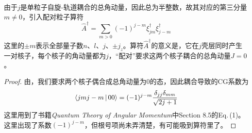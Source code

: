 由于$j$是单粒子自旋-轨道耦合的总角动量，因此总为半整数，故其对应的第三分量$m\neq 0$，引入配对粒子算符
\begin{equation}
    \hat{A}^{\dagger} = \sum_{m > 0} (-1)^{j - m} \xi_{jm}^{\dagger} \xi_{j-m}^{\dagger}
    \label{def:pair}
\end{equation}
这里的$\pm m$表示全部量子数$n$、$l$、$j$、$\pm j_z$。算符$\hat{A}^{\dagger}$的意义是，它在$j$壳层同时产生一对核子，每个核子的角动量都为$j$，“配对”要求这两个核子耦合的总角动量$J = 0$。
\begin{proof}
    由，我们要求两个核子偶合成总角动量为0的态，因此耦合导致的CG系数为
    \begin{equation*}
        \Braket{jmj-m | 00} = (-1)^{j - m} \frac{\delta_{jj}\delta_{mm}}{\sqrt{2j + 1}}
    \end{equation*}
    这里用到了书籍\textit{Quantum Theory of Angular Momentum}中Section 8.5的Eq.\,(1)。
    这里出现了系数$(-1)^{j-m}$，但根号项尚未弄清楚，有可能吸到算符里了。
\end{proof}

